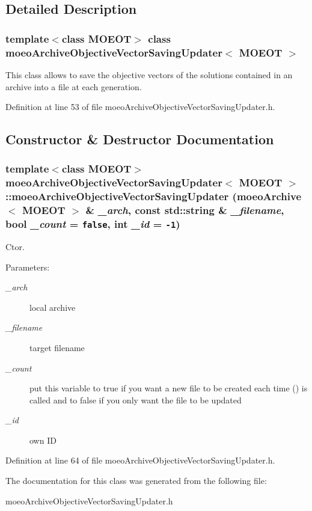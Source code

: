 \subsection{Detailed Description}
\subsubsection*{template$<$class MOEOT$>$ class moeo\-Archive\-Objective\-Vector\-Saving\-Updater$<$ MOEOT $>$}

This class allows to save the objective vectors of the solutions contained in an archive into a file at each generation. 



Definition at line 53 of file moeo\-Archive\-Objective\-Vector\-Saving\-Updater.h.

\subsection{Constructor \& Destructor Documentation}
\subsubsection{\setlength{\rightskip}{0pt plus 5cm}template$<$class MOEOT$>$ \bf{moeo\-Archive\-Objective\-Vector\-Saving\-Updater}$<$ MOEOT $>$::\bf{moeo\-Archive\-Objective\-Vector\-Saving\-Updater} (\bf{moeo\-Archive}$<$ MOEOT $>$ \& {\em \_\-arch}, const std::string \& {\em \_\-filename}, bool {\em \_\-count} = {\tt false}, int {\em \_\-id} = {\tt -1})\hspace{0.3cm}{\tt  [inline]}}\label{classmoeoArchiveObjectiveVectorSavingUpdater_d9f70d24605ccd1e89c8b4ea4c96c333}


Ctor. 

\begin{Desc}
\item[Parameters:]
\begin{description}
\item[{\em \_\-arch}]local archive \item[{\em \_\-filename}]target filename \item[{\em \_\-count}]put this variable to true if you want a new file to be created each time () is called and to false if you only want the file to be updated \item[{\em \_\-id}]own ID \end{description}
\end{Desc}


Definition at line 64 of file moeo\-Archive\-Objective\-Vector\-Saving\-Updater.h.

The documentation for this class was generated from the following file:\begin{CompactItemize}
\item 
moeo\-Archive\-Objective\-Vector\-Saving\-Updater.h\end{CompactItemize}

